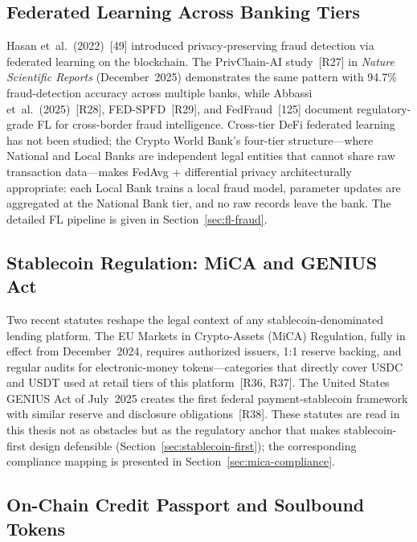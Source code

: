 \documentclass[12pt,a4paper]{report}
\begin{document}
\subsection{Federated Learning Across Banking Tiers}
\label{sec:lit-fl}

Hasan et~al.~(2022)~[49] introduced privacy-preserving fraud detection via federated learning on the blockchain. The PrivChain-AI study~[R27] in \textit{Nature Scientific Reports} (December~2025) demonstrates the same pattern with 94.7\% fraud-detection accuracy across multiple banks, while Abbassi et~al.~(2025)~[R28], FED-SPFD~[R29], and FedFraud~[125] document regulatory-grade FL for cross-border fraud intelligence. Cross-tier DeFi federated learning has not been studied; the Crypto World Bank's four-tier structure---where National and Local Banks are independent legal entities that cannot share raw transaction data---makes FedAvg + differential privacy architecturally appropriate: each Local Bank trains a local fraud model, parameter updates are aggregated at the National Bank tier, and no raw records leave the bank. The detailed FL pipeline is given in Section~\ref{sec:fl-fraud}.

\subsection{Stablecoin Regulation: MiCA and GENIUS Act}
\label{sec:lit-stablecoin-reg}

Two recent statutes reshape the legal context of any stablecoin-denominated lending platform. The EU Markets in Crypto-Assets (MiCA) Regulation, fully in effect from December~2024, requires authorized issuers, 1{:}1 reserve backing, and regular audits for electronic-money tokens---categories that directly cover USDC and USDT used at retail tiers of this platform~[R36, R37]. The United States GENIUS Act of July~2025 creates the first federal payment-stablecoin framework with similar reserve and disclosure obligations~[R38]. These statutes are read in this thesis not as obstacles but as the regulatory anchor that makes stablecoin-first design defensible (Section~\ref{sec:stablecoin-first}); the corresponding compliance mapping is presented in Section~\ref{sec:mica-compliance}.

\subsection{On-Chain Credit Passport and Soulbound Tokens}
\label{sec:lit-sbt}
\end{document}
